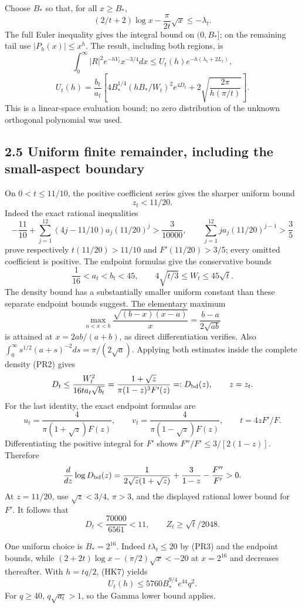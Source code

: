 \documentclass[10pt]{article}
\begin{document}
Choose \(B_*\) so that, for all \(x\ge B_*\), \[
 (2/t+2)\log x-\frac{\pi}{2t}\sqrt x\le-\lambda_t.
\] The full Euler inequality gives the integral bound on \((0,B_*]\); on the remaining tail use \(|P_h(x)|\le x^h\). The result, including both regions, is \[
 \int_0^\infty |R|^2e^{-hV_t}x^{-3/4}dx
 \le U_t(h)e^{-h(\lambda_t+2L_t)},
\] \[
 \boxed{U_t(h)=\frac{b_t}{a_t}
 \left[4B_*^{1/4}(hB_*/W_t)^2e^{4D_t}
       +2\sqrt{\frac{2\pi}{h(\pi/t)}}\right].}
 \tag{HK7}
\] This is a linear-space evaluation bound; no zero distribution of the unknown orthogonal polynomial was used.

\subsection{2.5 Uniform finite remainder, including the small-aspect boundary}\label{uniform-finite-remainder-including-the-small-aspect-boundary}

On \(0<t\le11/10\), the positive coefficient series gives the sharper uniform bound \[
 z_t<11/20.
\] Indeed the exact rational inequalities \[
 -\frac{11}{10}+\sum_{j=1}^{12}(4j-11/10)a_j(11/20)^j
 >\frac3{10000},\qquad
 \sum_{j=1}^{12}ja_j(11/20)^{j-1}>\frac35
\] prove respectively \(t(11/20)>11/10\) and \(F'(11/20)>3/5\); every omitted coefficient is positive. The endpoint formulas give the conservative bounds \[
 \frac1{16}<a_t<b_t<45,\qquad
 4\sqrt{t/3}\le W_t\le45\sqrt t.
\] The density bound has a substantially smaller uniform constant than these separate endpoint bounds suggest. The elementary maximum \[
 \max_{a<x<b}\frac{\sqrt{(b-x)(x-a)}}x
 =\frac{b-a}{2\sqrt{ab}}
\] is attained at \(x=2ab/(a+b)\), as direct differentiation verifies. Also \(\int_0^\infty s^{1/2}(a+s)^{-2}ds=\pi/(2\sqrt a)\). Applying both estimates inside the complete density (PR2) gives \[
 D_t\le\frac{W_t^2}{16t a_t\sqrt{b_t}}
 =\frac{1+\sqrt z}{\pi(1-z)^3F'(z)}
 =:D_{\rm bd}(z),\qquad z=z_t.
\] For the last identity, the exact endpoint formulas are \[
 u_t=\frac4{\pi(1+\sqrt z)F(z)},\qquad
 v_t=\frac4{\pi(1-\sqrt z)F(z)},\qquad t=4zF'/F.
\] Differentiating the positive integral for \(F'\) shows \(F''/F'\le3/[2(1-z)]\). Therefore \[
 \frac d{dz}\log D_{\rm bd}(z)
 =\frac1{2\sqrt z(1+\sqrt z)}+\frac3{1-z}-\frac{F''}{F'}>0.
\] At \(z=11/20\), use \(\sqrt z<3/4\), \(\pi>3\), and the displayed rational lower bound for \(F'\). It follows that \[
 \boxed{D_t<\frac{70000}{6561}<11,\qquad
 Z_t\ge\sqrt t/2048.}
 \tag{HK8}
\]

One uniform choice is \(B_*=2^{16}\). Indeed \(t\lambda_t\le20\) by (PR3) and the endpoint bounds, while \((2+2t)\log x-(\pi/2)\sqrt x<-20\) at \(x=2^{16}\) and decreases thereafter. With \(h=tq/2\), (HK7) yields \[
 U_t(h)\le5760 B_*^{9/4}e^{44}q^2.
 \tag{HK9}
\] For \(q\ge40\), \(q\sqrt{a_t}>1\), so the Gamma lower bound applies.
\end{document}
